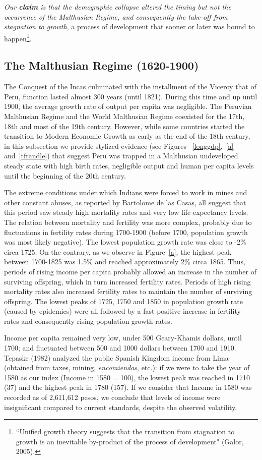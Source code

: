 \documentclass[12pt]{article}%
\begin{document}
\emph{Our \textbf{claim} is that the demographic collapse altered the timing but not the occurrence of the Malthusian Regime, and consequently the take-off from stagnation to growth}, a process of development that sooner or later was bound to happen\footnote{``Unified growth theory suggests that the transition from stagnation to growth is an inevitable by-product of the process of development" (Galor, 2005).}.
\subsection{The Malthusian Regime (1620-1900)}
The Conquest of the Incas culminated with the installment of the Viceroy that of Peru, function lasted almost 300 years (until 1821). During this time and up until 1900, the average growth rate of output per capita was negligible. The Peruvian Malthusian Regime and the World Malthusian Regime coexisted for the 17th, 18th and most of the 19th century. However, while some countries started the transition to Modern Economic Growth as early as the end of the 18th century, in this subsection we provide stylized evidence (see Figures ~\ref{longgdp},~\ref{a} and~\ref{tfrandle}) that suggest Peru was trapped in a Malthusian undeveloped steady state with high birth rates, negligible output and human per capita levels until the beginning of the 20th century.

The extreme conditions under which Indians were forced to work in mines and other constant abuses, as reported by Bartolome de las Casas, all suggest that this period saw steady high mortality rates and very low life expectancy levels. The relation between mortality and fertility was more complex, probably due to fluctuations in fertility rates during 1700-1900 (before 1700, population growth was most likely negative). The lowest population growth rate was close to -2\% circa 1725. On the contrary, as we observe in Figure~\ref{a}, the highest peak between 1700-1825 was 1.5\% and reached approximately 2\% circa 1865. Thus, periods of rising income per capita probably allowed an increase in the number of surviving offspring, which in turn increased fertility rates. Periods of high rising mortality rates also increased fertility rates to maintain the number of surviving offspring. The lowest peaks of 1725, 1750 and 1850 in population growth rate (caused by epidemics) were all followed by a fast positive increase in fertility rates and consequently rising population growth rates.

Income per capita remained very low, under 500 Geary-Khamis dollars, until 1700; and fluctuated between 500 and 1000 dollars between 1700 and 1910. Tepaske (1982) analyzed the public Spanish Kingdom income from Lima (obtained from taxes, mining, \emph{encomiendas}, etc.): if we were to take the year of 1580 as our index (Income in 1580 = 100), the lowest peak was reached in 1710 (37) and the highest peak in 1780 (157). If we consider that Income in 1580 was recorded as of 2,611,612 pesos, we conclude that levels of income were insignificant compared to current standards, despite the observed volatility.
\end{document}
